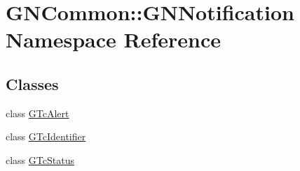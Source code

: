 \hypertarget{namespace_g_n_common_1_1_g_n_notification}{}\section{G\+N\+Common\+:\+:G\+N\+Notification Namespace Reference}
\label{namespace_g_n_common_1_1_g_n_notification}
\subsection*{Classes}
\begin{DoxyCompactItemize}
\item 
class \mbox{\hyperlink{class_g_n_common_1_1_g_n_notification_1_1_g_tc_alert}{G\+Tc\+Alert}}
\item 
class \mbox{\hyperlink{class_g_n_common_1_1_g_n_notification_1_1_g_tc_identifier}{G\+Tc\+Identifier}}
\item 
class \mbox{\hyperlink{class_g_n_common_1_1_g_n_notification_1_1_g_tc_status}{G\+Tc\+Status}}
\end{DoxyCompactItemize}

